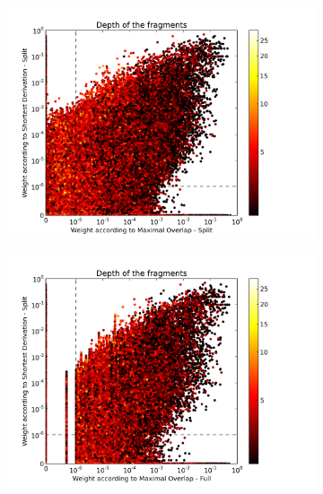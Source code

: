 \begin{figure}
\center
\begin{subfigure}{0.32\textwidth}
\includegraphics[width=\linewidth,trim=0.5cm 0cm 2.5cm 0.5cm, clip=true]{../data/plots/0.png}
\caption{}
\label{f:SDS-MOS}
\end{subfigure}
\begin{subfigure}{0.32\textwidth}
\includegraphics[width=\linewidth,trim=0.5cm 0cm 2.5cm 0.5cm, clip=true]{../data/plots/1.png}
\caption{}
\label{f:SDS-MOF}
\end{subfigure}
\begin{subfigure}{0.32\textwidth}

\end{subfigure}
\end{figure}
